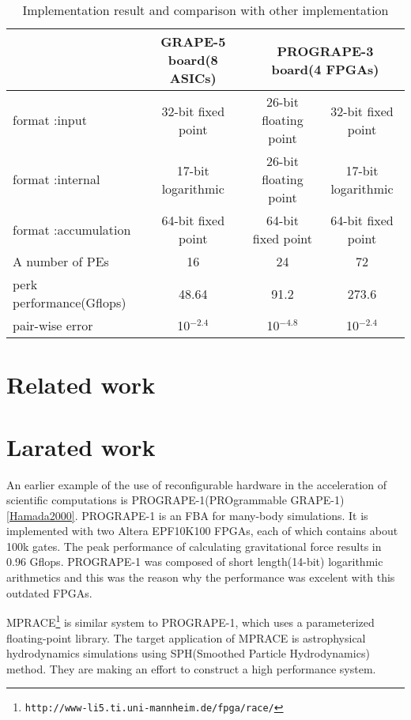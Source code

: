 \documentclass[times, 10pt,twocolumn]{article}
\begin{document}
\begin{table*}
\caption{Implementation result and comparison with other implementation}
\begin{center}
\begin{tabular}{lccc}
\hline
\hline
                     & GRAPE-5 board(8 ASICs) & \multicolumn{2}{c}{PROGRAPE-3 board(4 FPGAs)}  \\
\hline
format :input        & 32-bit fixed point  & 26-bit floating point & 32-bit fixed point \\
format :internal     & 17-bit logarithmic  & 26-bit floating point & 17-bit logarithmic \\
format :accumulation & 64-bit fixed point  & 64-bit fixed point    & 64-bit fixed point \\
A number of PEs      & 16                  &   24                  &   72               \\
perk performance(Gflops)    & 48.64       & 91.2                  & 273.6               \\
pair-wise error             & 10$^{-2.4}$   &  10$^{-4.8}$ & 10$^{-2.4}$                \\

\hline
\hline
\end{tabular}
\end{center}
\label{tabcompg5}
\end{table*}

\section{Related work}
\section{Larated work}
An earlier example of the use of reconfigurable hardware in the
acceleration of scientific computations is PROGRAPE-1(PROgrammable
GRAPE-1)\ref{Hamada2000}. PROGRAPE-1 is an FBA for many-body
simulations. It is implemented with two Altera EPF10K100 FPGAs, each
of which contains about 100k gates. The peak performance of
calculating gravitational force results in 0.96 Gflops.  PROGRAPE-1
was composed of short length(14-bit) logarithmic arithmetics and this
was the reason why the performance was excelent with this outdated
FPGAs.

MPRACE\footnote{\tt http://www-li5.ti.uni-mannheim.de/fpga/race/} is
similar system to PROGRAPE-1, which uses a parameterized
floating-point library\cite{GKM02}.  The target application of MPRACE
is astrophysical hydrodynamics simulations using SPH(Smoothed Particle
Hydrodynamics) method.  They are making an effort to construct a high
performance system.
\end{document}
